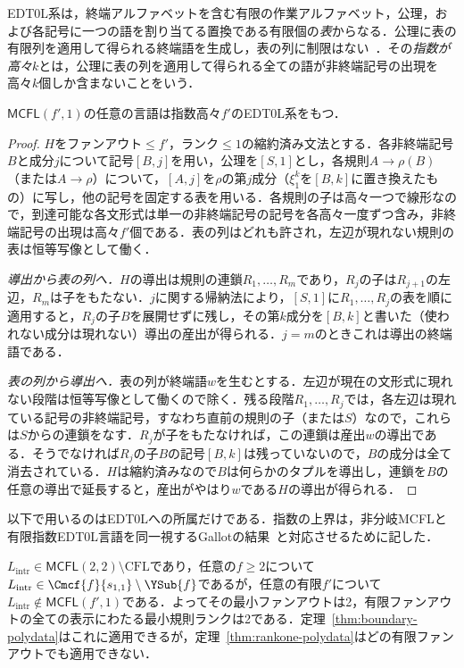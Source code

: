 EDT0L系は，終端アルファベットを含む有限の作業アルファベット，公理，および各記号に一つの語を割り当てる置換である有限個の\emph{表}からなる．公理に表の有限列を適用して得られる終端語を生成し，表の列に制限はない~\cite[Definition~37]{Gallot2021}．その\emph{指数が高々$k$}とは，公理に表の列を適用して得られる全ての語が非終端記号の出現を高々$k$個しか含まないことをいう．

\begin{lemma}
\label{lem:rank-one-edt0l}
$\mathsf{MCFL}(f',1)$の任意の言語は指数高々$f'$のEDT0L系をもつ．
\end{lemma}

\begin{proof}
$H$をファンアウト$\le f'$，ランク$\le1$の縮約済み文法とする．各非終端記号$B$と成分$j$について記号$[B,j]$を用い，公理を$[S,1]$とし，各規則$A\to\rho(B)$（または$A\to\rho$）について，$[A,j]$を$\rho$の第$j$成分（$\xi_1^k$を$[B,k]$に置き換えたもの）に写し，他の記号を固定する表を用いる．各規則の子は高々一つで線形なので，到達可能な各文形式は単一の非終端記号の記号を各高々一度ずつ含み，非終端記号の出現は高々$f'$個である．表の列はどれも許され，左辺が現れない規則の表は恒等写像として働く．

\emph{導出から表の列へ．}$H$の導出は規則の連鎖$R_1,\ldots,R_m$であり，$R_j$の子は$R_{j+1}$の左辺，$R_m$は子をもたない．$j$に関する帰納法により，$[S,1]$に$R_1,\ldots,R_j$の表を順に適用すると，$R_j$の子$B$を展開せずに残し，その第$k$成分を$[B,k]$と書いた（使われない成分は現れない）導出の産出が得られる．$j=m$のときこれは導出の終端語である．

\emph{表の列から導出へ．}表の列が終端語$w$を生むとする．左辺が現在の文形式に現れない段階は恒等写像として働くので除く．残る段階$R_1,\ldots,R_j$では，各左辺は現れている記号の非終端記号，すなわち直前の規則の子（または$S$）なので，これらは$S$からの連鎖をなす．$R_j$が子をもたなければ，この連鎖は産出$w$の導出である．そうでなければ$R_j$の子$B$の記号$[B,k]$は残っていないので，$B$の成分は全て消去されている．$H$は縮約済みなので$B$は何らかのタプルを導出し，連鎖を$B$の任意の導出で延長すると，産出がやはり$w$である$H$の導出が得られる．
\end{proof}

以下で用いるのはEDT0Lへの所属だけである．指数の上界は，非分岐MCFLと有限指数EDT0L言語を同一視するGallotの結果~\cite[Theorem~29]{Gallot2021}と対応させるために記した．

\begin{theorem}
\label{thm:intrinsic-ranktwo-witness}
$L_{\mathrm{intr}}\in\mathsf{MCFL}(2,2)\setminus\mathrm{CFL}$であり，任意の$f\ge2$について$L_{\mathrm{intr}}\in\Cmcf{f}{s_{1,1}}\setminus\YSub{f}$であるが，任意の有限$f'$について$L_{\mathrm{intr}}\notin\mathsf{MCFL}(f',1)$である．よってその最小ファンアウトは2，有限ファンアウトの全ての表示にわたる最小規則ランクは2である．定理~\ref{thm:boundary-polydata}はこれに適用できるが，定理~\ref{thm:rankone-polydata}はどの有限ファンアウトでも適用できない．
\end{theorem}

